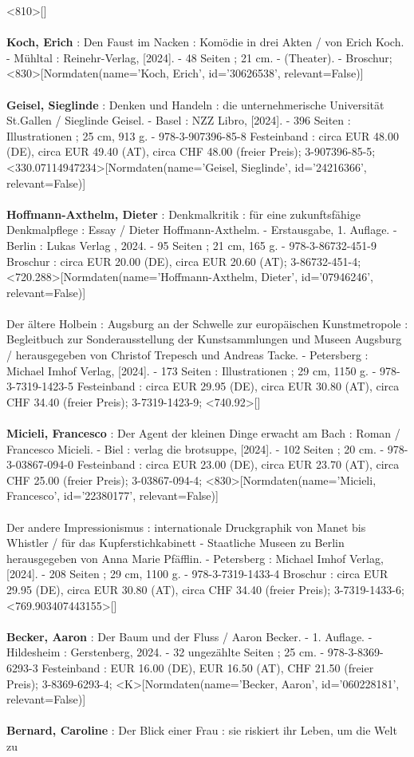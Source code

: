 \documentclass{article}
\begin{document}
\begin{multicols}{3}
<810>[]\\\\\textbf{Koch, Erich} : Den Faust im Nacken : Komödie in drei Akten / von Erich Koch. - Mühltal : Reinehr-Verlag, [2024]. - 48 Seiten ; 21 cm. - (Theater). - Broschur; <830>[Normdaten(name='Koch, Erich', id='30626538', relevant=False)]\\\\\textbf{Geisel, Sieglinde} : Denken und Handeln : die unternehmerische Universität St.Gallen / Sieglinde Geisel. - Basel : NZZ Libro, [2024]. - 396 Seiten : Illustrationen ; 25 cm, 913 g. - 978-3-907396-85-8 Festeinband : circa EUR 48.00 (DE), circa EUR 49.40 (AT), circa CHF 48.00 (freier Preis); 3-907396-85-5; <330.07114947234>[Normdaten(name='Geisel, Sieglinde', id='24216366', relevant=False)]\\\\\textbf{Hoffmann-Axthelm, Dieter} : Denkmalkritik : für eine zukunftsfähige Denkmalpflege : Essay / Dieter Hoffmann-Axthelm. - Erstausgabe, 1. Auflage. - Berlin : Lukas Verlag , 2024. - 95 Seiten ; 21 cm, 165 g. - 978-3-86732-451-9 Broschur : circa EUR 20.00 (DE), circa EUR 20.60 (AT); 3-86732-451-4; <720.288>[Normdaten(name='Hoffmann-Axthelm, Dieter', id='07946246', relevant=False)]\\\\Der ältere Holbein : Augsburg an der Schwelle zur europäischen Kunstmetropole : Begleitbuch zur Sonderausstellung der Kunstsammlungen und Museen Augsburg / herausgegeben von Christof Trepesch und Andreas Tacke. - Petersberg : Michael Imhof Verlag, [2024]. - 173 Seiten : Illustrationen ; 29 cm, 1150 g. - 978-3-7319-1423-5 Festeinband : circa EUR 29.95 (DE), circa EUR 30.80 (AT), circa CHF 34.40 (freier Preis); 3-7319-1423-9; <740.92>[]\\\\\textbf{Micieli, Francesco} : Der Agent der kleinen Dinge erwacht am Bach : Roman / Francesco Micieli. - Biel : verlag die brotsuppe, [2024]. - 102 Seiten ; 20 cm. - 978-3-03867-094-0 Festeinband : circa EUR 23.00 (DE), circa EUR 23.70 (AT), circa CHF 25.00 (freier Preis); 3-03867-094-4; <830>[Normdaten(name='Micieli, Francesco', id='22380177', relevant=False)]\\\\Der andere Impressionismus : internationale Druckgraphik von Manet bis Whistler / für das Kupferstichkabinett - Staatliche Museen zu Berlin herausgegeben von Anna Marie Pfäfflin. - Petersberg : Michael Imhof Verlag, [2024]. - 208 Seiten ; 29 cm, 1100 g. - 978-3-7319-1433-4 Broschur : circa EUR 29.95 (DE), circa EUR 30.80 (AT), circa CHF 34.40 (freier Preis); 3-7319-1433-6; <769.903407443155>[]\\\\\textbf{Becker, Aaron} : Der Baum und der Fluss / Aaron Becker. - 1. Auflage. - Hildesheim : Gerstenberg, 2024. - 32 ungezählte Seiten ; 25 cm. - 978-3-8369-6293-3 Festeinband : EUR 16.00 (DE), EUR 16.50 (AT), CHF 21.50 (freier Preis); 3-8369-6293-4; <K>[Normdaten(name='Becker, Aaron', id='060228181', relevant=False)]\\\\\textbf{Bernard, Caroline} : Der Blick einer Frau : sie riskiert ihr Leben, um die Welt zu 
\end{multicols}
\end{document}
